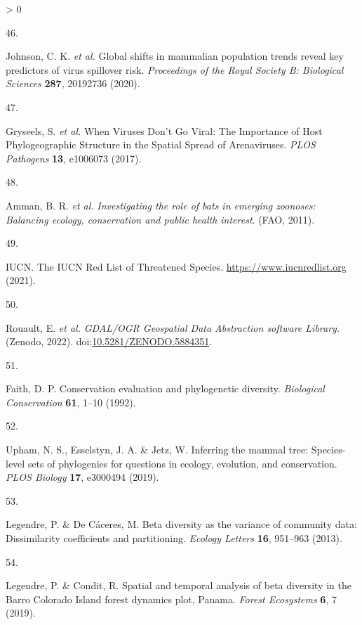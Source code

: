 \documentclass[11pt]{article}
\newlength{\cslhangindent}
\newlength{\csllabelwidth}
\newenvironment{CSLReferences}[3] %
 {%
  \setlength{\parindent}{0pt}
  \ifodd #1 \everypar{\setlength{\hangindent}{\cslhangindent}}\ignorespaces\fi
  \ifnum #2 > 0
  \setlength{\parskip}{#2\baselineskip}
  \fi
 }%
 {}
\newcommand{\CSLLeftMargin}[1]{\parbox[t]{\maxof{\widthof{#1}}{\csllabelwidth}}{#1}}
\newcommand{\CSLRightInline}[1]{\parbox[t]{\linewidth}{#1}}
\begin{document}
\begin{CSLReferences}{0}{0}
\leavevmode\hypertarget{ref-Johnson2020GloShi}{}%
\CSLLeftMargin{46. }
\CSLRightInline{Johnson, C. K. \emph{et al.} Global shifts in mammalian
population trends reveal key predictors of virus spillover risk.
\emph{Proceedings of the Royal Society B: Biological Sciences}
\textbf{287}, 20192736 (2020).}

\leavevmode\hypertarget{ref-Gryseels2017WheVir}{}%
\CSLLeftMargin{47. }
\CSLRightInline{Gryseels, S. \emph{et al.} When Viruses Don't Go Viral:
The Importance of Host Phylogeographic Structure in the Spatial Spread
of Arenaviruses. \emph{PLOS Pathogens} \textbf{13}, e1006073 (2017).}

\leavevmode\hypertarget{ref-Amman2011InvRol}{}%
\CSLLeftMargin{48. }
\CSLRightInline{Amman, B. R. \emph{et al.} \emph{Investigating the role
of bats in emerging zoonoses: Balancing ecology, conservation and public
health interest}. (FAO, 2011).}

\leavevmode\hypertarget{ref-IUCN2021IucRed}{}%
\CSLLeftMargin{49. }
\CSLRightInline{IUCN. The IUCN Red List of Threatened Species.
\url{https://www.iucnredlist.org} (2021).}

\leavevmode\hypertarget{ref-RouaultEven2022GdaOgr}{}%
\CSLLeftMargin{50. }
\CSLRightInline{Rouault, E. \emph{et al.} \emph{GDAL/OGR Geospatial Data
Abstraction software Library}. (Zenodo, 2022).
doi:\href{https://doi.org/10.5281/ZENODO.5884351}{10.5281/ZENODO.5884351}.}

\leavevmode\hypertarget{ref-Faith1992ConEva}{}%
\CSLLeftMargin{51. }
\CSLRightInline{Faith, D. P. Conservation evaluation and phylogenetic
diversity. \emph{Biological Conservation} \textbf{61}, 1--10 (1992).}

\leavevmode\hypertarget{ref-Upham2019InfMam}{}%
\CSLLeftMargin{52. }
\CSLRightInline{Upham, N. S., Esselstyn, J. A. \& Jetz, W. Inferring the
mammal tree: Species-level sets of phylogenies for questions in ecology,
evolution, and conservation. \emph{PLOS Biology} \textbf{17}, e3000494
(2019).}

\leavevmode\hypertarget{ref-Legendre2013BetDiv}{}%
\CSLLeftMargin{53. }
\CSLRightInline{Legendre, P. \& De Cáceres, M. Beta diversity as the
variance of community data: Dissimilarity coefficients and partitioning.
\emph{Ecology Letters} \textbf{16}, 951--963 (2013).}

\leavevmode\hypertarget{ref-Legendre2019SpaTem}{}%
\CSLLeftMargin{54. }
\CSLRightInline{Legendre, P. \& Condit, R. Spatial and temporal analysis
of beta diversity in the Barro Colorado Island forest dynamics plot,
Panama. \emph{Forest Ecosystems} \textbf{6}, 7 (2019).}


\end{CSLReferences}
\end{document}
